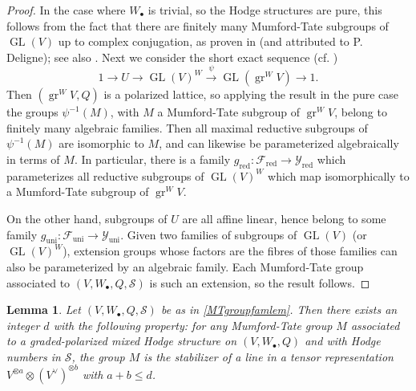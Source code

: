 \documentclass[10pt]{article}
\numberwithin{equation}{section}
\theoremstyle{plain}
\newtheorem{lem}[thm]{Lemma}
\theoremstyle{definition}
\theoremstyle{remark}
\newcommand{\GL}{\operatorname{GL}}
\begin{document}
\begin{proof}
In the case where $W_{\bullet}$ is trivial, so the Hodge structures are pure, this follows from the fact that there are finitely many Mumford-Tate subgroups of $\GL(V)$ up to complex conjugation, as proven in \cite[Thm. 4.14]{zbMATH06492665} (and attributed to P. Deligne); see also \cite[Lemma (page 58)]{zbMATH00764346}. Next we consider the short exact sequence (cf. \cite[Lemma 2]{MR1154159})
\[ 1 \to U \to \GL(V)^{W} \xrightarrow{\psi} \GL(\operatorname{gr}^{W} V) \to 1 . \]
Then $(\operatorname{gr}^{W} V, Q)$ is a polarized lattice, so applying the result in the pure case the groups $\psi^{-1}(M)$, with $M$ a Mumford-Tate subgroup of $\operatorname{gr}^{W} V$, belong to finitely many algebraic families. Then all maximal reductive subgroups of $\psi^{-1}(M)$ are isomorphic to $M$, and can likewise be parameterized algebraically in terms of $M$. In particular, there is a family $g_{\operatorname{red}} : \mathcal{F}_{\operatorname{red}} \to \mathcal{Y}_{\operatorname{red}}$ which parameterizes all reductive subgroups of $\GL(V)^{W}$ which map isomorphically to a Mumford-Tate subgroup of $\operatorname{gr}^{W} V$.

On the other hand, subgroups of $U$ are all affine linear, hence belong to some family $g_{\operatorname{uni}} : \mathcal{F}_{\operatorname{uni}} \to \mathcal{Y}_{\operatorname{uni}}$. Given two families of subgroups of $\GL(V)$ (or $\GL(V)^{W}$), extension groups whose factors are the fibres of those families can also be parameterized by an algebraic family. Each Mumford-Tate group associated to $(V, W_{\bullet}, Q, \mathcal{S})$ is such an extension, so the result follows.
\end{proof}

\begin{lem}\label{lem:chev}
Let $(V, W_{\bullet}, Q, \mathcal{S})$ be as in \autoref{MTgroupfamlem}. Then there exists an integer $d$ with the following property: for any Mumford-Tate group $M$ associated to a graded-polarized mixed Hodge structure on $(V, W_{\bullet}, Q)$ and with Hodge numbers in $\mathcal{S}$, the group $M$ is the stabilizer of a line in a tensor representation $V^{\otimes a} \otimes (V^{\vee})^{\otimes b}$ with $a + b \leq d$. 
\end{lem}
\end{document}
